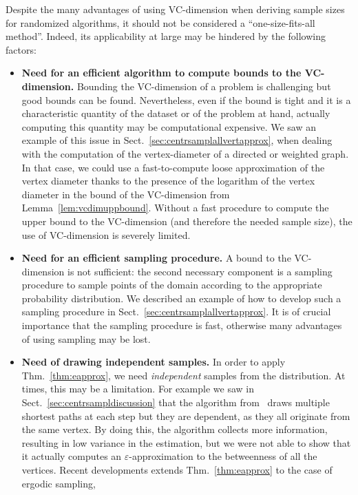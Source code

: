 Despite the many advantages of using VC-dimension when deriving sample sizes
for randomized algorithms, it should not be considered a ``one-size-fits-all
method''. Indeed, its applicability at large may be hindered by the following
factors:
\begin{itemize}
  \item{\bf Need for an efficient algorithm to compute bounds to the
    VC-dimension.} Bounding the VC-dimension of a problem is  challenging but
    good bounds can be found. Nevertheless, even if the bound is tight and it is a
    characteristic quantity of the dataset or of the problem at hand, actually
    computing this quantity may be computational expensive. We saw an example of
    this issue in Sect.~\ref{sec:centrsamplallvertapprox}, when dealing with the
    computation of the vertex-diameter of a directed or weighted graph. In that
    case, we could use a fast-to-compute loose approximation of the vertex
    diameter thanks to the presence of the logarithm of the vertex diameter in the bound of the
    VC-dimension from Lemma~\ref{lem:vcdimuppbound}. Without a fast procedure to
    compute the upper bound to the VC-dimension (and therefore the needed sample
    size), the use of VC-dimension is severely limited.
  \item{\bf Need for an efficient sampling procedure.} A bound to the
    VC-dimension is not sufficient: the second necessary component is a sampling
    procedure to sample points of the domain according to the appropriate
    probability distribution. We described an example of how to develop such a
    sampling procedure in Sect.~\ref{sec:centrsamplallvertapprox}. It is of
    crucial importance that the sampling procedure is fast, otherwise many
    advantages of using sampling may be lost.
  \item{\bf Need of drawing independent samples.} In order to apply
    Thm.~\ref{thm:eapprox}, we need \emph{independent} samples from the
    distribution. At times, this may be a limitation. For example we saw in
    Sect.~\ref{sec:centrsampldiscussion} that the algorithm
    from~\citep{BrandesP07} draws multiple shortest paths at each step but they
    are dependent, as they all originate from the same vertex. By doing this,
    the algorithm collects more information, resulting in low variance in the
    estimation, but we were not able to show that it actually computes an
    $\varepsilon$-approximation to the betweenness of all the vertices. Recent
    developments extends Thm.~\ref{thm:eapprox} to the case of ergodic sampling,

\end{itemize}
